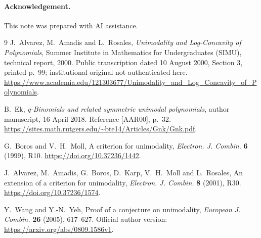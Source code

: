 \documentclass[11pt]{article}
\begin{document}
\paragraph{Acknowledgement.}
This note was prepared with AI assistance.

\begin{thebibliography}{9}\small
{}
J.~Alvarez, M.~Amadis and L.~Rosales,
\emph{Unimodality and Log-Concavity of Polynomials},
Summer Institute in Mathematics for Undergraduates (SIMU), technical
report, 2000. Public transcription dated 10 August 2000, Section 3,
printed p.~99; institutional original not authenticated here.
\url{https://www.academia.edu/121303677/Unimodality_and_Log_Concavity_of_Polynomials}.

B.~Ek, \emph{q-Binomials and related symmetric unimodal polynomials},
author manuscript, 16 April 2018. Reference [AAR00], p.~32.
\url{https://sites.math.rutgers.edu/~bte14/Articles/Gnk/Gnk.pdf}.

G.~Boros and V.~H.~Moll, A criterion for unimodality,
\emph{Electron. J. Combin.} \textbf{6} (1999), R10.
\url{https://doi.org/10.37236/1442}.

J.~Alvarez, M.~Amadis, G.~Boros, D.~Karp, V.~H.~Moll and L.~Rosales,
An extension of a criterion for unimodality,
\emph{Electron. J. Combin.} \textbf{8} (2001), R30.
\url{https://doi.org/10.37236/1574}.

Y.~Wang and Y.-N.~Yeh, Proof of a conjecture on unimodality,
\emph{European J. Combin.} \textbf{26} (2005), 617--627.
Official author version: \url{https://arxiv.org/abs/0809.1586v1}.
\end{thebibliography}
\end{document}
